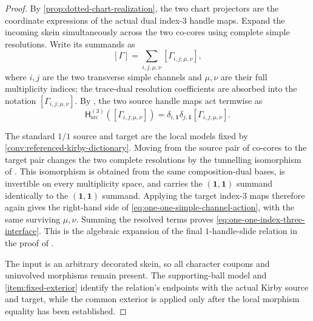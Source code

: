 \begin{proof}
By \cref{prop:dotted-chart-realization}, the two chart projectors are the
coordinate expressions of the actual dual index-$3$ handle maps.  Expand the
incoming skein simultaneously across the two co-cores using complete simple
resolutions.  Write its summands as
\[
  [\Gamma]
  =\sum_{i,j,\mu,\nu}[\Gamma_{i,j;\mu,\nu}],
\]
where $i,j$ are the two transverse simple channels and $\mu,\nu$ are their
full multiplicity indices; the trace-dual resolution coefficients are
absorbed into the notation $[\Gamma_{i,j;\mu,\nu}]$.  By
\cite[Definition~5.11, $k=3$]{Tham2021}, the
two source handle maps act termwise as
\[
  \mathsf H^{(3)}_{\mathrm{src}}
    ([\Gamma_{i,j;\mu,\nu}])
  =\delta_{i,\mathbf1}\delta_{j,\mathbf1}
    [\Gamma_{i,j;\mu,\nu}].
  \tag{3.4a}\label{eq:one-one-simple-channel-action}
\]

The standard $1/1$ source and target are the local models fixed by
\cref{conv:referenced-kirby-dictionary}.  Moving from the source pair of
co-cores to the target pair changes the two complete resolutions by the
tunnelling isomorphism of
\cite[Lemma~2.28, Equation~(2.17)]{Tham2021}.  This isomorphism is obtained
from the same composition-dual bases, is invertible on every multiplicity
space, and carries the $(\mathbf1,\mathbf1)$ summand identically to the
$(\mathbf1,\mathbf1)$ summand.  Applying the target index-$3$ maps therefore
again gives the right-hand side of
\eqref{eq:one-one-simple-channel-action}, with the same surviving
$\mu,\nu$.  Summing the resolved terms proves
\eqref{eq:one-one-index-three-interface}.  This is the algebraic expansion
of the final $1$-handle-slide relation in the proof of
\cite[Proposition~5.13, pp.~53--54]{Tham2021}.

The input is an arbitrary decorated skein, so all character coupons and
uninvolved morphisms remain present.  The supporting-ball model and
\cref{item:fixed-exterior} identify the relation's endpoints with the actual
Kirby source and target, while the common exterior is applied only after the
local morphism equality has been established.
\end{proof}

